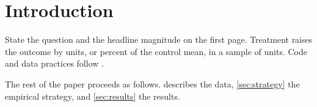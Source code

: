 \section{Introduction}\label{sec:introduction}

State the question and the headline magnitude on the first page. Treatment
raises the outcome by  units, or 
percent of the control mean, in a sample of  units. Code and data
practices follow \citet{Gentzkow2014b}.

The rest of the paper proceeds as follows.  describes the data,
\cref{sec:strategy} the empirical strategy, and \cref{sec:results} the results.
